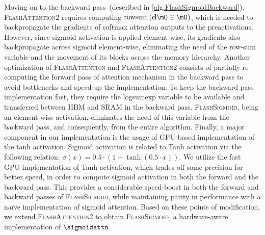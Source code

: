 Moving on to the backward pass~(described in \cref{alg:FlashSigmoidBackward}), \textsc{FlashAttention2} requires computing $\textrm{rowsum}\left(\mathbf{d}\mO\odot \mO\right)$, which is needed to backpropagate the gradients of softmax attention outputs to the preactivations.
However, since sigmoid activation is applied element-wise, its gradients also backpropagate across sigmoid element-wise, eliminating the need of the row-sum variable and the movement of its blocks across the memory hierarchy. 
Another optimization of \textsc{FlashAttention} and \textsc{FlashAttention2} consists of partially re-computing the forward pass of attention mechanism in the backward pass to avoid bottlenecks and speed-up the implementation.
To keep the backward pass implementation fast, they require the logsumexp variable to be available and transferred between HBM and SRAM in the backward pass.
\textsc{FlashSigmoid}, being an element-wise activation, eliminates the need of this variable from the backward pass, and consequently, from the entire algorithm. 
Finally, a major component in our implementation is the usage of GPU-based implementation of the \textrm{tanh} activation. 
Sigmoid activation is related to Tanh activation via the following relation: $\sigma\left(x\right) = 0.5\cdot \left(1 + \tanh\left(0.5\cdot x\right)\right)$. 
We utilize the fast GPU-implementation of Tanh activation, which trades off some precision for better speed, in order to compute sigmoid activation in both the forward and the backward pass. 
This provides a considerable speed-boost in both the forward and backward passes of \textsc{FlashSigmoid}, while maintaining parity in performance with a na\"ive implementation of sigmoid attention. 
Based on these points of modification, we extend \textsc{FlashAttention2} to obtain \textsc{FlashSigmoid}, a hardware-aware implementation of $\sigmoidattn$. 
